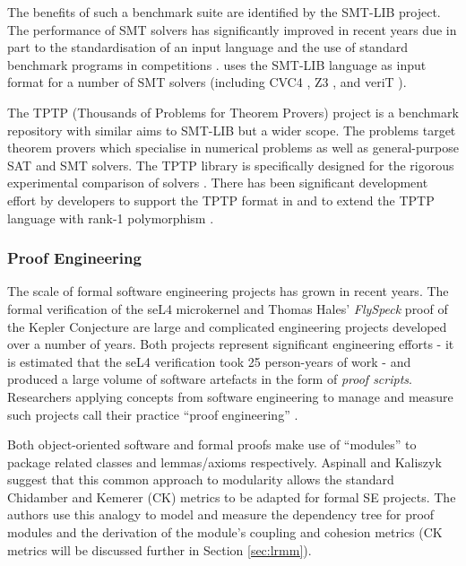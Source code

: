 The benefits of such a benchmark suite are identified by the SMT-LIB \cite{SMTLIB} project. The performance of SMT solvers has significantly improved in recent years due in part to the standardisation of an input language and the use of standard benchmark programs in competitions \cite{SMTEVAL2013}. \why uses the SMT-LIB language as input format for a number of SMT solvers (including CVC4 \cite{CVC4}, Z3 \cite{Z3}, and veriT \cite{veriT}). 

The TPTP (Thousands of Problems for Theorem Provers) project \cite{TPTP} is a benchmark repository with similar aims to SMT-LIB but a wider scope. The problems target theorem provers which specialise in numerical problems as well as general-purpose SAT and SMT solvers. The TPTP library is specifically designed for the rigorous experimental comparison of solvers \cite{Sutcliffe200139}. There has been significant development effort by \why developers to support the TPTP format in \why and to extend the TPTP language with rank-1 polymorphism \cite{why:tptp}. 

\subsubsection{Proof Engineering}
\label{sub:lrsvmmpe}

The scale of formal software engineering projects has grown in recent years. The formal verification of the seL4 microkernel \cite{Klein:2014:CFV} and Thomas Hales' \textit{FlySpeck} proof of the Kepler Conjecture \cite{hales-kepler} are large and complicated engineering projects developed over a number of years. Both projects represent significant engineering efforts - it is estimated that the seL4 verification took 25 person-years of work - and produced a large volume of software artefacts in the form of \textit{proof scripts}. Researchers applying concepts from software engineering to manage and measure such projects call their practice ``proof engineering'' \cite{Klein2014}.

Both object-oriented software and formal proofs make use of ``modules'' to package related classes and lemmas/axioms respectively. Aspinall and Kaliszyk \cite{Aspinall2016} suggest that this common approach to modularity allows the standard Chidamber and Kemerer \cite{CandK} (CK) metrics to be adapted for formal SE projects. The authors use this analogy to model and measure the dependency tree for proof modules and the derivation of the module's coupling and cohesion metrics (CK metrics will be discussed further in Section \ref{sec:lrmm}).

